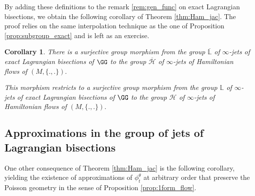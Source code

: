 \documentclass[a4paper,11pt]{article}
\newtheorem{corollary}[theorem]{Corollary}
\begin{document}
By adding these definitions to the remark \ref{rem:gen_func} on exact Lagrangian bisections, we obtain the following corollary of Theorem \ref{thm:Ham_jac}. The proof relies on the same interpolation technique as the one of Proposition \ref{prop:subgroup_exact} and is left as an exercise.

\begin{corollary}\label{cor:iso}
There is a surjective group morphism from the group $\overline{\mathbb{L}}$ of $\infty$-jets of exact Lagrangian bisections of $\GG$ to the group $\overline{\mathcal{H}}$ of $\infty$-jets of Hamiltonian flows of $(M,\{.,.\}).$

This morphism restricts to a surjective group morphism from the group $\mathbb{L}$ of $\infty$-jets of exact Lagrangian bisections of $\GG$ to the group $\mathcal{H}$ of $\infty$-jets of Hamiltonian flows of $(M,\{.,.\}).$
\end{corollary}



\subsection{Approximations in the group of jets of Lagrangian bisections}

One other consequence of Theorem \ref{thm:Ham_jac} is the following corollary, yielding the existence of approximations of $\phi^{\theta}_t$ at arbitrary order that preserve the Poisson geometry in the sense of Proposition \ref{prop:1form_flow}.
\end{document}
